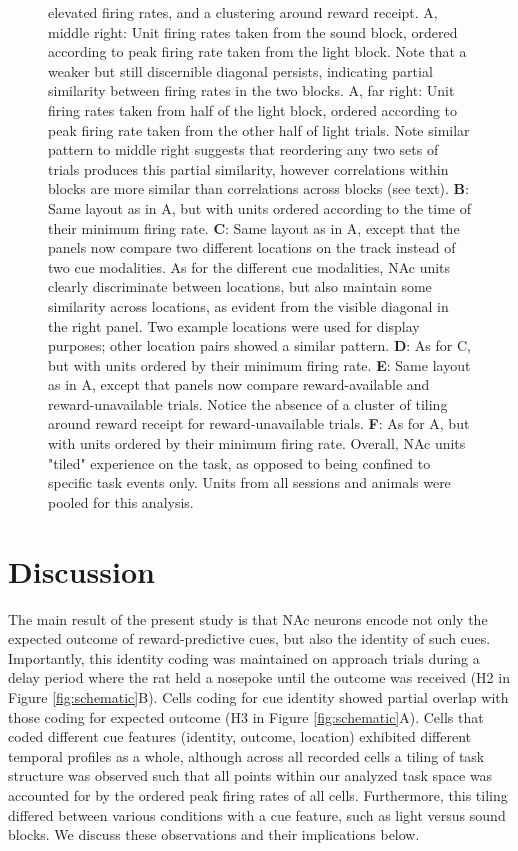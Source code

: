 \documentclass[11pt]{article}
\newcommand{\bsf}[1]{\textbf{#1}}
\begin{document}
{\begin{figure}[h]
{  elevated firing rates, and a clustering around reward receipt. A, middle
  right: Unit firing rates taken from the sound block, ordered according to peak
  firing rate taken from the light block. Note that a weaker but still
  discernible diagonal persists, indicating partial similarity between firing
  rates in the two blocks. A, far right: Unit firing rates taken from half of
  the light block, ordered according to peak firing rate taken from the other
  half of light trials. Note similar pattern to middle right suggests that
  reordering any two sets of trials produces this partial similarity, however
  correlations within blocks are more similar than correlations across blocks
  (see text). \bsf{B}: Same layout as in A, but with units ordered according to
  the time of their minimum firing rate. \bsf{C}: Same layout as in A, except
  that the panels now compare two different locations on the track instead of
  two cue modalities. As for the different cue modalities, NAc units clearly
  discriminate between locations, but also maintain some similarity across
  locations, as evident from the visible diagonal in the right panel. Two
  example locations were used for display purposes; other location pairs showed
  a similar pattern. \bsf{D}: As for C, but with units ordered by their minimum
  firing rate. \bsf{E}: Same layout as in A, except that panels now compare
  reward-available and reward-unavailable trials. Notice the absence of a
  cluster of tiling around reward receipt for reward-unavailable
  trials. \bsf{F}: As for A, but with units ordered by their minimum firing
  rate. Overall, NAc units "tiled" experience on the task, as opposed to being
  confined to specific task events only. Units from all sessions and animals
  were pooled for this analysis.}
\label{fig:NP_tiling}
\end{figure}

\section*{Discussion}

The main result of the present study is that NAc neurons encode not
only the expected outcome of reward-predictive cues, but also the
identity of such cues. Importantly, this identity coding was
maintained on approach trials during a delay period where the rat held
a nosepoke until the outcome was received (H2 in Figure
\ref{fig:schematic}B). Cells coding for cue identity showed partial
overlap with those coding for expected outcome (H3 in Figure
\ref{fig:schematic}A). Cells that coded different cue features
(identity, outcome, location) exhibited different temporal profiles as
a whole, although across all recorded cells a tiling of task structure
was observed such that all points within our analyzed task space was
accounted for by the ordered peak firing rates of all
cells. Furthermore, this tiling differed between various conditions
with a cue feature, such as light versus sound blocks. We discuss
these observations and their implications below.

}
\end{document}
